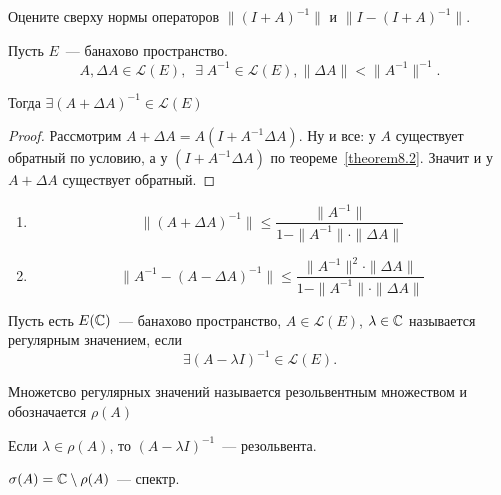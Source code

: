 \begin{exercise}
    Оцените сверху нормы операторов 
    $\|(I + A)^{-1}\|$ и $\|I - (I + A)^{-1}\|$.
\end{exercise}

\begin{theorem}[8.3]\label{theorem8.3}
Пусть $E$~--- банахово пространство. \[A, \Delta A \in \mathcal{L}(E),\;\; \exists \; A^{-1} \in \mathcal{L}(E), \|\Delta A\| < \|A^{-1}\|^{-1}.\]

Тогда $\exists (A + \Delta A)^{-1} \in \mathcal{L}(E)$
\end{theorem}

\begin{proof} 
    Рассмотрим $A + \Delta A = A (I + A^{-1} \Delta A)$. Ну и все: у $A$ существует обратный по условию, а у $(I + A^{-1} \Delta A)$ по теореме~\ref{theorem8.2}. Значит и у $A+\Delta A$ существует обратный.
\end{proof}

\begin{exercise}
\begin{enumerate}
    \item 
    \[ \|(A+\Delta A)^{-1}\| \leqslant \frac{\|A^{-1}\|}{1-\|A^{-1}\| \cdot \|\Delta A\|} \]

    \item 
    \[
    \|A^{-1} - (A - \Delta A)^{-1}\| \leqslant 
    \frac{\|A^{-1}\|^2 \cdot \|\Delta A\|}{1 - \|A^{-1}\| \cdot \|\Delta A\|}
    \]
\end{enumerate}
\end{exercise}

\begin{definition}
    Пусть есть $E(\mathbb{C})$~--- банахово пространство, $A \in \mathcal{L}(E)$, $\lambda \in \mathbb{C}$ называется регулярным значением, если
    \[
    \exists (A - \lambda I)^{-1} \in \mathcal{L}(E).
    \]

    Множетсво регулярных значений называется резольвентным множеством и обозначается $\rho (A)$
\end{definition}

\begin{definition}
    Если $\lambda \in \rho(A)$, то $(A - \lambda I)^{-1}$~--- резольвента.
\end{definition}

\begin{definition}
    $\sigma(A)=\mathbb{C} \setminus \rho(A)$~--- спектр.
\end{definition}